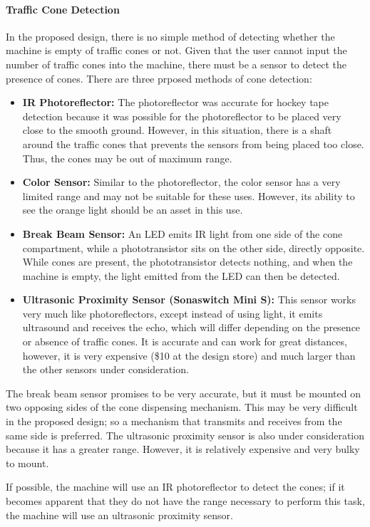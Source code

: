 \documentclass[11pt]{report}
\begin{document}
\paragraph{Traffic Cone Detection}
In the proposed design, there is no simple method of detecting whether the machine is empty of traffic cones or not. Given that the user cannot input the number of traffic cones into the machine, there must be a sensor to detect the presence of cones. There are three prposed methods of cone detection:
\begin{itemize}
\item{\textbf{IR Photoreflector:}
The photoreflector was accurate for hockey tape detection because it was possible for the photoreflector to be placed very close to the smooth ground. However, in this situation, there is a shaft around the traffic cones that prevents the sensors from being placed too close. Thus, the cones may be out of maximum range.}
\item{\textbf{Color Sensor:}
Similar to the photoreflector, the color sensor has a very limited range and may not be suitable for these uses. However, its ability to see the orange light should be an asset in this use.}
\item{\textbf{Break Beam Sensor:}
An LED emits IR light from one side of the cone compartment, while a phototransistor sits on the other side, directly opposite. While cones are present, the phototransistor detects nothing, and when the machine is empty, the light emitted from the LED can then be detected. }
\item{\textbf{Ultrasonic Proximity Sensor (Sonaswitch Mini S):}
This sensor works very much like photoreflectors, except instead of using light, it emits ultrasound and receives the echo, which will differ depending on the presence or absence of traffic cones. It is accurate and can work for great distances, however, it is very expensive (\$10 at the design store) and much larger than the other sensors under consideration.}
\end{itemize}

The break beam sensor promises to be very accurate, but it must be mounted on two opposing sides of the cone dispensing mechanism. This may be very difficult in the proposed design; so a mechanism that transmits and receives from the same side is preferred. The ultrasonic proximity sensor is also under consideration because it has a greater range. However, it is relatively expensive and very bulky to mount.

If possible, the machine will use an IR photoreflector to detect the cones; if it becomes apparent that they do not have the range necessary to perform this task, the machine will use an ultrasonic proximity sensor.
\end{document}
